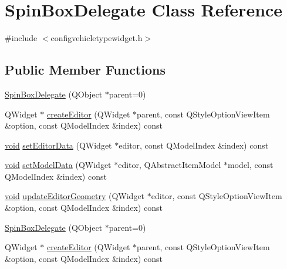 \hypertarget{class_spin_box_delegate}{\section{\-Spin\-Box\-Delegate \-Class \-Reference}
\label{class_spin_box_delegate}
}


{\ttfamily \#include $<$configvehicletypewidget.\-h$>$}

\subsection*{\-Public \-Member \-Functions}
\begin{DoxyCompactItemize}
\item 
\hyperlink{group___config_plugin_gabf1b830266511d0237c97b46f49e01f9}{\-Spin\-Box\-Delegate} (\-Q\-Object $\ast$parent=0)
\item 
\-Q\-Widget $\ast$ \hyperlink{group___config_plugin_ga4fc1b4a209668b60b0834bdb1d36e1c0}{create\-Editor} (\-Q\-Widget $\ast$parent, const \-Q\-Style\-Option\-View\-Item \&option, const \-Q\-Model\-Index \&index) const 
\item 
\hyperlink{group___u_a_v_objects_plugin_ga444cf2ff3f0ecbe028adce838d373f5c}{void} \hyperlink{group___config_plugin_gacbac1fc1091ef04b08ca9683a1d6f0ee}{set\-Editor\-Data} (\-Q\-Widget $\ast$editor, const \-Q\-Model\-Index \&index) const 
\item 
\hyperlink{group___u_a_v_objects_plugin_ga444cf2ff3f0ecbe028adce838d373f5c}{void} \hyperlink{group___config_plugin_ga3698304b3741f548b0b4755c1782d291}{set\-Model\-Data} (\-Q\-Widget $\ast$editor, \-Q\-Abstract\-Item\-Model $\ast$model, const \-Q\-Model\-Index \&index) const 
\item 
\hyperlink{group___u_a_v_objects_plugin_ga444cf2ff3f0ecbe028adce838d373f5c}{void} \hyperlink{group___config_plugin_ga3a90cff710ddd79a11b31054f9c963fb}{update\-Editor\-Geometry} (\-Q\-Widget $\ast$editor, const \-Q\-Style\-Option\-View\-Item \&option, const \-Q\-Model\-Index \&index) const 
\item 
\hyperlink{group___telemetry_scheduler_gadget_plugin_gabf1b830266511d0237c97b46f49e01f9}{\-Spin\-Box\-Delegate} (\-Q\-Object $\ast$parent=0)
\item 
\-Q\-Widget $\ast$ \hyperlink{group___telemetry_scheduler_gadget_plugin_gac8f09d5e036c7bd963db0e66e9ac1bfb}{create\-Editor} (\-Q\-Widget $\ast$parent, const \-Q\-Style\-Option\-View\-Item \&option, const \-Q\-Model\-Index \&index) const 
\item 

\end{DoxyCompactItemize}
